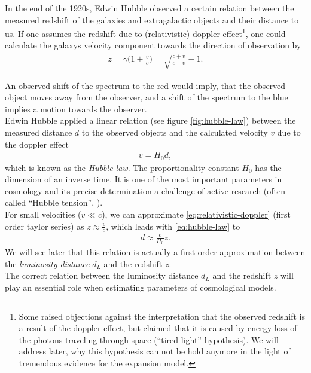 \noindent In the end of the 1920s, Edwin Hubble observed a certain relation between the measured redshift of the galaxies and extragalactic objects and their distance to us. If one assumes the redshift due to (relativistic) doppler effect\footnote{Some raised objections against the interpretation that the observed redshift is a result of the doppler effect, but claimed that it is caused by energy loss of the photons traveling through space (``tired light''-hypothesis). We will address later, why this hypothesis can not be hold anymore in the light of tremendous evidence for the expansion model.}, one could calculate the galaxys velocity component towards the direction of observation by
\begin{align}
    z = \gamma \biggl( 1 + \frac{v}{c} \biggr) = \sqrt{\frac{c + v}{c - v}} - 1. \label{eq:relativistic-doppler}
\end{align} 

\noindent An observed shift of the spectrum to the red would imply, that the observed object moves away from the observer, and a shift of the spectrum to the blue implies a motion towards the observer. \\
\noindent Edwin Hubble applied a linear relation (see figure \ref{fig:hubble-law}) between the measured distance $d$ to the observed objects and the calculated velocity $v$ due to the doppler effect
\begin{align}
    v = H_{0} d, \label{eq:hubble-law}
\end{align}
which is known as the \textit{Hubble law}. The proportionality constant $H_{0}$ has the dimension of an inverse time. It is one of the most important parameters in cosmology and its precise determination a challenge of active research (often called ``Hubble tension'', \cite{DiValentino2021}). \\ 

\noindent For small velocities ($v \ll c$), we can approximate \eqref{eq:relativistic-doppler} (first order taylor series) as $z \approx \frac{v}{c}$, which leads with \eqref{eq:hubble-law} to 
\begin{align}
    d \approx \frac{c}{H_{0}} z. \label{eq:lum-dist-approx} 
\end{align}
We will see later that this relation is actually a first order approximation between the \textit{luminosity distance} $d_{L}$ and the redshift $z$. \\
The correct relation between the luminosity distance $d_{L}$ and the redshift $z$ will play an essential role when estimating parameters of cosmological models.


